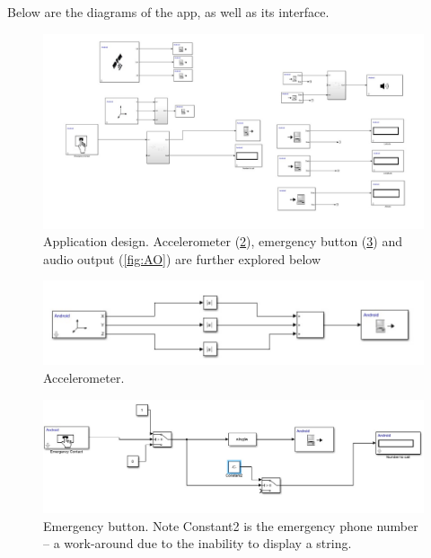 \documentclass[12pt,a4paper]{article}
\begin{document}
    Below are the diagrams of the app, as well as its interface.
    \begin{figure}[h]
        \includegraphics[width=\textwidth]{./files/Overview.jpeg}
        \caption{Application design. Accelerometer (\ref{fig:Acc}), emergency button (\ref{fig:EB}) and audio output (\ref{fig:AO}) are further explored below }
        \label{fig:Overview}
    \end{figure}
\begin{figure}[h]
    \centering
    \includegraphics[width=\textwidth]{files/Accelerometer.jpeg}
    \caption{Accelerometer.}
    \label{fig:Acc}
\end{figure}
\begin{figure}[h]
    \centering
    \includegraphics[width=\textwidth]{files/EmergencyButton.jpeg}
    \caption{Emergency button. Note Constant2 is the emergency phone number -- a work-around due to the inability to display a string.}
    \label{fig:EB}
\end{figure}
\end{document}
